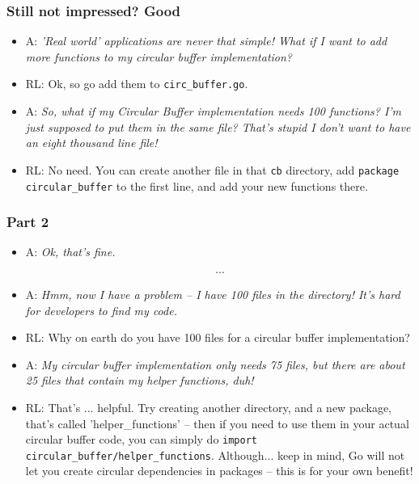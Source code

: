 \documentclass{beamer}
\begin{document}
\begin{frame}
\frametitle{Still not impressed? Good}

\begin{itemize}

\item A: \textit{ 'Real world' applications are never that simple! What if I want to add more functions to my circular buffer implementation?}

\item RL: Ok, so go add them to \texttt{circ\_buffer.go}.

\item A: \textit{So, what if my Circular Buffer implementation needs 100 functions? I'm just supposed to put them in the same file? That's stupid I don't want to have an eight thousand line file!}

\item RL: No need. You can create another file in that \texttt{cb} directory, add \texttt{package circular\_buffer} to the first line, and add your new functions there. 


\end{itemize}
\end{frame}

\begin{frame}
\frametitle{Part 2}

\begin{itemize}
\item A: \textit{Ok, that's fine.}

$$ \cdots $$ 

\item A: \textit{Hmm, now I have a problem -- I have 100 files in the directory! It's hard for developers to find my code.}

\item RL: Why on earth do you have 100 files for a circular buffer implementation?

\item A: \textit{ My circular buffer implementation only needs 75 files, but there are about 25 files that contain my helper functions, duh! }

\item RL: That's ... helpful. Try creating another directory, and a new package, that's called 'helper\_functions' -- then if you need to use them in your actual circular buffer code, you can simply do \texttt{import circular\_buffer/helper\_functions}.  Although... keep in mind, Go will not let you create circular dependencies in packages -- this is for your own benefit!

\end{itemize}

\end{frame}
\end{document}
